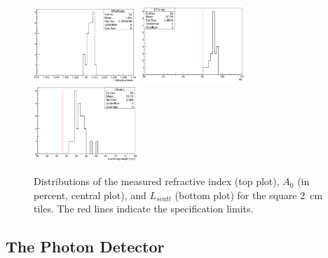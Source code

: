 \documentclass[5p,times,twocolumn]{elsarticle}
\begin{document}
\begin{figure}
\begin{center}
\includegraphics[width=0.35\textwidth]{AeroRefInd_2cm.pdf}
\includegraphics[width=0.35\textwidth]{AeroA0_2cm.pdf}
\includegraphics[width=0.35\textwidth]{AeroLscatt_2cm.pdf}
\caption{Distributions of the measured refractive index (top plot), $A_0$ (in percent, central plot), and $L_{scatt}$
  (bottom plot) for the square 2~cm tiles. The red lines indicate the specification limits.}
\label{Fig:Aerogel_2cm}
\end{center}
\end{figure}

\subsection{The Photon Detector}
\end{document}
